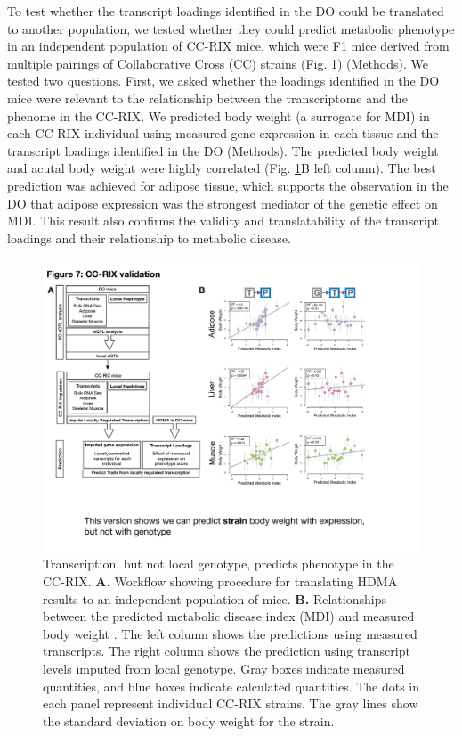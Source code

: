 \documentclass[
]{article}
\providecommand{\DIFaddtex}[1]{{\protect\color{blue}\uwave{#1}}} %
\providecommand{\DIFdeltex}[1]{{\protect\color{red}\sout{#1}}}                      %
\providecommand{\DIFaddbegin}{} %
\providecommand{\DIFaddend}{} %
\providecommand{\DIFdelbegin}{} %
\providecommand{\DIFdelend}{} %
\providecommand{\DIFaddFL}[1]{\DIFadd{#1}} %
\providecommand{\DIFaddbeginFL}{} %
\providecommand{\DIFaddendFL}{} %
\providecommand{\DIFadd}[1]{\texorpdfstring{\DIFaddtex{#1}}{#1}} %
\providecommand{\DIFdel}[1]{\texorpdfstring{\DIFdeltex{#1}}{}} %
\newcommand{\DIFscaledelfig}{0.5}
\newlength{\DIFdelgraphicswidth} %
\newlength{\DIFdelgraphicsheight} %
\newcommand{\DIFaddincludegraphics}[2][]{{\color{blue}\fbox{\DIFOincludegraphics[#1]{#2}}}} %
\newcommand{\DIFdelincludegraphics}[2][]{%
\sbox{\DIFdelgraphicsbox}{\DIFOincludegraphics[#1]{#2}}%
\settoboxwidth{\DIFdelgraphicswidth}{\DIFdelgraphicsbox} %
\settoboxtotalheight{\DIFdelgraphicsheight}{\DIFdelgraphicsbox} %
\scalebox{\DIFscaledelfig}{%
\parbox[b]{\DIFdelgraphicswidth}{\usebox{\DIFdelgraphicsbox}\\[-\baselineskip] \rule{\DIFdelgraphicswidth}{0em}}\llap{\resizebox{\DIFdelgraphicswidth}{\DIFdelgraphicsheight}{%
\setlength{\unitlength}{\DIFdelgraphicswidth}%
\begin{picture}(1,1)%
\thicklines\linethickness{2pt} %
{\color[rgb]{1,0,0}\put(0,0){\framebox(1,1){}}}%
{\color[rgb]{1,0,0}\put(0,0){\line( 1,1){1}}}%
{\color[rgb]{1,0,0}\put(0,1){\line(1,-1){1}}}%
\end{picture}%
}\hspace*{3pt}}} %
} %
\DeclareRobustCommand{\DIFaddbegin}{\DIFOaddbegin \let\includegraphics\DIFaddincludegraphics} %
\DeclareRobustCommand{\DIFaddend}{\DIFOaddend \let\includegraphics\DIFOincludegraphics} %
\DeclareRobustCommand{\DIFdelbegin}{\DIFOdelbegin \let\includegraphics\DIFdelincludegraphics} %
\DeclareRobustCommand{\DIFdelend}{\DIFOaddend \let\includegraphics\DIFOincludegraphics} %
\DeclareRobustCommand{\DIFaddbeginFL}{\DIFOaddbeginFL \let\includegraphics\DIFaddincludegraphics} %
\DeclareRobustCommand{\DIFaddendFL}{\DIFOaddendFL \let\includegraphics\DIFOincludegraphics} %
\begin{document}
To test whether the transcript loadings identified in the DO could be
translated to another population, we tested whether they could predict
metabolic \DIFdelbegin \DIFdel{phenotype }\DIFdelend \DIFaddbegin \DIFadd{phenotypes }\DIFaddend in an independent population of CC-RIX mice, which
were F1 mice derived from multiple pairings of Collaborative Cross (CC)
\cite{pmid28592495, pmid21411855, 
pmid17674098, pmid15514660} strains (Fig. \ref{fig:cc_prediction})
(Methods). We tested two questions. First, we asked whether the loadings
identified in the DO mice were relevant to the relationship between the
transcriptome and the phenome in the CC-RIX. We predicted body weight (a
surrogate for MDI) in each CC-RIX individual using measured gene
expression in each tissue and the transcript loadings identified in the
DO (Methods). The predicted body weight and acutal body weight were
highly correlated (Fig. \ref{fig:cc_prediction}B left column). The best
prediction was achieved for adipose tissue, which supports the
observation in the DO that adipose expression was the strongest mediator
of the genetic effect on MDI. This result also confirms the validity and
translatability of the transcript loadings and their relationship to
metabolic disease.

\begin{figure}[ht!]
\includegraphics[width=\textwidth]{Figures/Fig7_CC_Prediction.pdf} 
\caption{Transcription, but not local genotype, predicts 
phenotype in the CC-RIX. \textbf{A.} Workflow showing procedure 
for translating HDMA results to an independent population of mice. 
\textbf{B.} Relationships between the predicted metabolic disease
index (MDI) and measured body weight \DIFaddbeginFL \DIFaddFL{in the CC-RIX}\DIFaddendFL . The left column 
shows the predictions using measured transcripts. The right column 
shows the prediction using transcript levels imputed from local 
genotype. Gray boxes indicate measured quantities, and blue boxes 
indicate calculated quantities. The dots in each panel represent 
individual CC-RIX strains. The gray lines show the standard deviation 
on body weight for the strain.
}
\label{fig:cc_prediction}
\end{figure}
\end{document}
